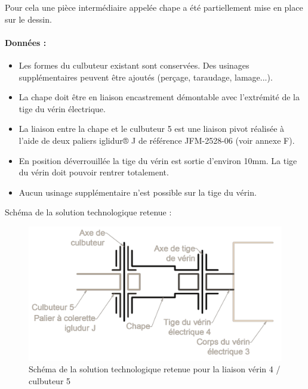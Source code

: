 Pour cela une pièce intermédiaire appelée chape a été partiellement  mise en place sur le dessin.

\paragraph{Données :}
\begin{itemize}
 \item Les formes du culbuteur existant sont conservées. Des usinages supplémentaires peuvent être ajoutés (perçage, taraudage, lamage...).
 \item La chape doit être en liaison encastrement démontable avec l’extrémité de la tige du vérin électrique.
 \item La liaison entre la chape et le culbuteur 5 est une liaison pivot réalisée à l’aide de deux paliers iglidur® J de référence JFM-2528-06 (voir annexe F).
 \item En position déverrouillée la tige du vérin est sortie d’environ 10mm. La tige du vérin doit pouvoir rentrer totalement.
 \item Aucun usinage supplémentaire n’est possible sur la tige du vérin.
\end{itemize}

Schéma de la solution technologique retenue :

\begin{figure}[!h]
\centering\includegraphics[width=0.6\linewidth]{img/fig14}
 \caption{Schéma de la solution technologique retenue pour la liaison vérin 4 / culbuteur 5}
 \label{img14}
\end{figure}


